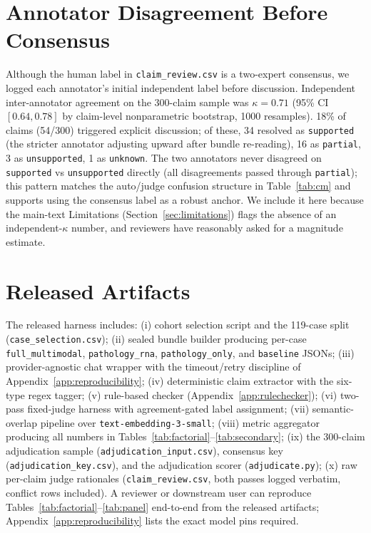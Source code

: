 \documentclass{article}
\theoremstyle{plain}
\begin{document}
\section{Annotator Disagreement Before Consensus}
\label{app:annot}

Although the human label in \texttt{claim\_review.csv} is a two-expert consensus, we logged each annotator's initial independent label before discussion. Independent inter-annotator agreement on the 300-claim sample was $\kappa = 0.71$ (95\% CI $[0.64, 0.78]$ by claim-level nonparametric bootstrap, 1000 resamples). 18\% of claims (54/300) triggered explicit discussion; of these, 34 resolved as \texttt{supported} (the stricter annotator adjusting upward after bundle re-reading), 16 as \texttt{partial}, 3 as \texttt{unsupported}, 1 as \texttt{unknown}. The two annotators never disagreed on \texttt{supported} vs \texttt{unsupported} directly (all disagreements passed through \texttt{partial}); this pattern matches the auto/judge confusion structure in Table~\ref{tab:cm} and supports using the consensus label as a robust anchor. We include it here because the main-text Limitations (Section~\ref{sec:limitations}) flags the absence of an independent-$\kappa$ number, and reviewers have reasonably asked for a magnitude estimate.

\section{Released Artifacts}
\label{app:artifacts}

The released harness includes: (i) cohort selection script and the 119-case split (\texttt{case\_selection.csv}); (ii) sealed bundle builder producing per-case \texttt{full\_multimodal}, \texttt{pathology\_rna}, \texttt{pathology\_only}, and \texttt{baseline} JSONs; (iii) provider-agnostic chat wrapper with the timeout/retry discipline of Appendix~\ref{app:reproducibility}; (iv) deterministic claim extractor with the six-type regex tagger; (v) rule-based checker (Appendix~\ref{app:rulechecker}); (vi) two-pass fixed-judge harness with agreement-gated label assignment; (vii) semantic-overlap pipeline over \texttt{text-embedding-3-small}; (viii) metric aggregator producing all numbers in Tables~\ref{tab:factorial}--\ref{tab:secondary}; (ix) the 300-claim adjudication sample (\texttt{adjudication\_input.csv}), consensus key (\texttt{adjudication\_key.csv}), and the adjudication scorer (\texttt{adjudicate.py}); (x) raw per-claim judge rationales (\texttt{claim\_review.csv}, both passes logged verbatim, conflict rows included). A reviewer or downstream user can reproduce Tables~\ref{tab:factorial}--\ref{tab:panel} end-to-end from the released artifacts; Appendix~\ref{app:reproducibility} lists the exact model pins required.
\end{document}
